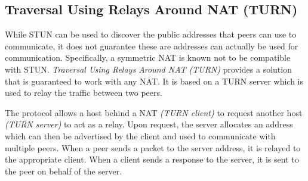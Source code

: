\subsection{Traversal Using Relays Around NAT (TURN)}

While STUN can be used to discover the public addresses that peers can use to communicate, it does not guarantee these are addresses can actually be used for communication. Specifically, a symmetric NAT is known not to be compatible with STUN. \textit{Traversal Using Relays Around NAT (TURN)} provides a solution that is guaranteed to work with any NAT. It is based on a TURN server which is used to relay the traffic between two peers.

The protocol allows a host behind a NAT \textit{(TURN client)} to request another host \textit{(TURN server)} to act as a relay. Upon request, the server allocates an address which can then be advertised by the client and used to communicate with multiple peers. When a peer sends a packet to the server address, it is relayed to the appropriate client. When a client sends a response to the server, it is sent to the peer on behalf of the server.

